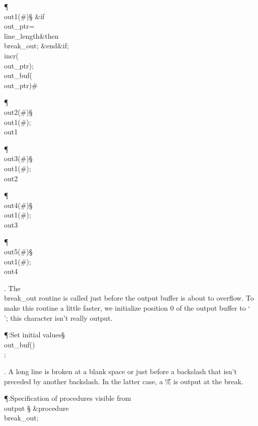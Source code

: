 \Y\P\4\D\\{out1}\?\1(\?\#\?\2)\S\?\6
\&{if}\1\1\8\\{out\_ptr}\?=\?\\{line\_length}\2\8\&{then}\6
\\{break\_out};\2\6
\&{end}\8\2\&{if}\1;\6
\\{incr}\?\1(\?\\{out\_ptr}\?\2)\?;\5
\\{out\_buf}\?\1(\?\\{out\_ptr}\?\2)\K\?\#\par
\P\4\D\\{out2}\?\1(\?\#\?\2)\S\?\\{out1}\?\1(\?\#\?\2)\?;\5
\\{out1}\par
\P\4\D\\{out3}\?\1(\?\#\?\2)\S\?\\{out1}\?\1(\?\#\?\2)\?;\5
\\{out2}\par
\P\4\D\\{out4}\?\1(\?\#\?\2)\S\?\\{out1}\?\1(\?\#\?\2)\?;\5
\\{out3}\par
\P\4\D\\{out5}\?\1(\?\#\?\2)\S\?\\{out1}\?\1(\?\#\?\2)\?;\5
\\{out4}\par
\fi

. The \\{break\_out} routine is called just before the output buffer is
about
to overflow. To make this routine a little faster, we initialize position
0 of the output buffer to `\.\\'; this character isn't really output.

\Y\P\?\4:Set initial values\X\mathrel{+}\S\?\6
\\{out\_buf}\?\1(\?\2)\K\?\H{\\};\par
\fi

. A long line is broken at a blank space or just before a backslash that
isn't
preceded by another backslash. In the latter case, a \H{\%} is output at
the break.

\Y\P\?\4:Specification of procedures visible from \\{output}\X\mathrel{+}%
\S\?\6
\&{procedure}\8\1\\{break\_out}\2;\par
\fi

